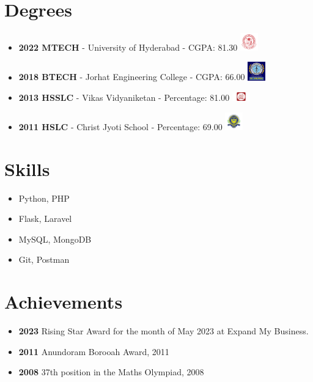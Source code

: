 \documentclass[10pt,a4paper]{article}
\begin{document}
\begin{paracol}{2}
\begin{leftcolumn}
\section*{Degrees}
\textcolor{textgrey}{
\begin{itemize}
    \item \textbf{2022 MTECH} - University of Hyderabad - CGPA: 81.30 \hfill \includegraphics[width=0.06\textwidth,height=0.06\textwidth,keepaspectratio]{uoh.png}
    \item \textbf{2018 BTECH} - Jorhat Engineering College - CGPA: 66.00 \hfill \includegraphics[width=0.06\textwidth,height=0.06\textwidth,keepaspectratio]{JEC_logo.jpg}
    \item \textbf{2013 HSSLC} - Vikas Vidyaniketan - Percentage: 81.00 \hfill \includegraphics[width=0.06\textwidth,height=0.06\textwidth,keepaspectratio]{VIKAS.png}
    \item \textbf{2011 HSLC} - Christ Jyoti School - Percentage: 69.00 \hfill \includegraphics[width=0.06\textwidth,height=0.06\textwidth,keepaspectratio]{CJS.png}
\end{itemize}
}

\section*{Skills}
\textcolor{textgrey}{
\begin{itemize}
    \item Python, PHP
    \item Flask, Laravel
    \item MySQL, MongoDB
    \item Git, Postman
\end{itemize}
}

\section*{Achievements}
\textcolor{textgrey}{
\begin{itemize}
    \item \textbf{2023} Rising Star Award for the month of May 2023 at Expand My Business.
    \item \textbf{2011} Anundoram Borooah Award, 2011
    \item \textbf{2008} 37th position in the Maths Olympiad, 2008
\end{itemize}
}


\end{leftcolumn}
\end{paracol}
\end{document}
